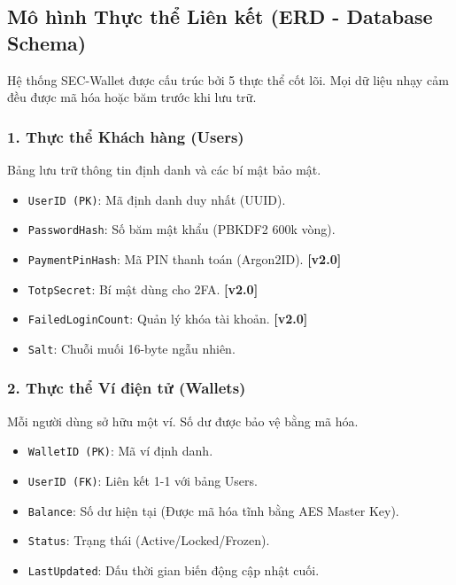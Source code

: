 \documentclass[11pt,a4paper]{article}
\begin{document}
\subsection{Mô hình Thực thể Liên kết (ERD - Database Schema)}
Hệ thống SEC-Wallet được cấu trúc bởi 5 thực thể cốt lõi. Mọi dữ liệu nhạy cảm đều được mã hóa hoặc băm trước khi lưu trữ.

\subsubsection{1. Thực thể Khách hàng (Users)}
Bảng lưu trữ thông tin định danh và các bí mật bảo mật. 
\begin{itemize}[noitemsep]
    \item \texttt{UserID (PK)}: Mã định danh duy nhất (UUID).
    \item \texttt{PasswordHash}: Số băm mật khẩu (PBKDF2 600k vòng).
    \item \texttt{PaymentPinHash}: Mã PIN thanh toán (Argon2ID). \textbf{[v2.0]}
    \item \texttt{TotpSecret}: Bí mật dùng cho 2FA. \textbf{[v2.0]}
    \item \texttt{FailedLoginCount}: Quản lý khóa tài khoản. \textbf{[v2.0]}
    \item \texttt{Salt}: Chuỗi muối 16-byte ngẫu nhiên.
\end{itemize}

\subsubsection{2. Thực thể Ví điện tử (Wallets)}
Mỗi người dùng sở hữu một ví. Số dư được bảo vệ bằng mã hóa.
\begin{itemize}[noitemsep]
    \item \texttt{WalletID (PK)}: Mã ví định danh.
    \item \texttt{UserID (FK)}: Liên kết 1-1 với bảng Users.
    \item \texttt{Balance}: Số dư hiện tại (Được mã hóa tĩnh bằng AES Master Key).
    \item \texttt{Status}: Trạng thái (Active/Locked/Frozen).
    \item \texttt{LastUpdated}: Dấu thời gian biến động cập nhật cuối.
\end{itemize}
\end{document}
